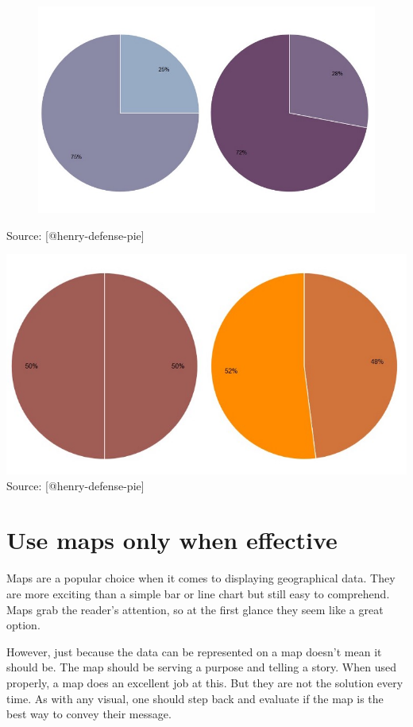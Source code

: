 \documentclass[]{book}
\theoremstyle{definition}
\theoremstyle{definition}
\theoremstyle{definition}
\theoremstyle{remark}
\begin{document}
\begin{figure}
\centering
\includegraphics{images/henry-quarter.png}
\caption{}
\end{figure}

Source: {[}@henry-defense-pie{]}

\includegraphics{images/henry-half.png} Source: {[}@henry-defense-pie{]}

\section{Use maps only when
effective}\label{use-maps-only-when-effective}

Maps are a popular choice when it comes to displaying geographical data.
They are more exciting than a simple bar or line chart but still easy to
comprehend. Maps grab the reader's attention, so at the first glance
they seem like a great option.

However, just because the data can be represented on a map doesn't mean
it should be. The map should be serving a purpose and telling a story.
When used properly, a map does an excellent job at this. But they are
not the solution every time. As with any visual, one should step back
and evaluate if the map is the best way to convey their message.
\end{document}
